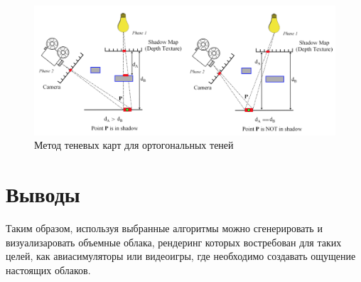 \begin{figure}[H]
    \centering
    \includegraphics[scale=0.4]{img/shadow.png}
    \caption{Метод теневых карт для ортогональных теней}
    \label{img:shadow}
\end{figure}

\section{Выводы}

Таким образом, используя выбранные алгоритмы можно сгенерировать и визуализаровать объемные облака,
рендеринг которых востребован для таких целей, как авиасимуляторы или видеоигры, где необходимо
создавать ощущение настоящих облаков.
